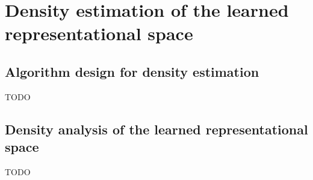 \chapter{Density estimation of the learned representational space}
\label{sec:Density}

\section{Algorithm design for density estimation}
TODO


\section{Density analysis of the learned representational space}
TODO

